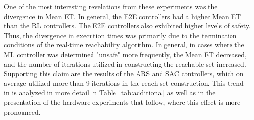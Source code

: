 \documentclass[manuscript,screen,review]{acmart}
\newcommand{\todo}[1]{\textcolor{red}{\textbf{\underline{TODO:}} #1}}
\begin{document}

One of the most interesting revelations from these experiments was the divergence in Mean ET. In general, the E2E controllers had a higher Mean ET than the RL controllers. The E2E controllers
also exhibited higher levels of safety. Thus, the divergence in execution times was primarily due to the termination conditions of the real-time reachability algorithm. In general, in cases where the ML controller was determined "unsafe" more frequently, the Mean ET decreased, and the number of iterations utilized in constructing the reachable set increased. Supporting this claim are the results of the ARS and SAC controllers, which on average utilized more than 9 iterations in the reach set construction. This trend in is analyzed in more detail in Table~\ref{tab:additional} as well as in the presentation of the hardware experiments that follow, where this effect is more pronounced.




\end{document}
